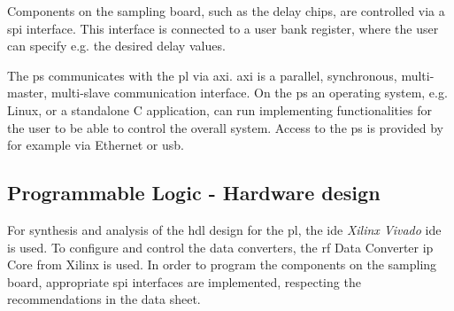 Components on the sampling board, such as the delay chips, are controlled via a \gls{spi} interface. 
This interface is connected to a user bank register, where the user can specify e.g. the desired delay values.

The \gls{ps} communicates with the \gls{pl} via \gls{axi}.
\gls{axi} is a parallel, synchronous, multi-master, multi-slave communication interface.
On the \gls{ps} an operating system, e.g. Linux, or a standalone C application, can run implementing functionalities for the user to be able to control the overall system.
Access to the \gls{ps} is provided by for example via Ethernet or \gls{usb}.


\subsection{Programmable Logic - Hardware design}
For synthesis and analysis of the \gls{hdl} design for the \gls{pl}, the \gls{ide} \textit{Xilinx Vivado} \gls{ide} is used.
To configure and control the data converters, the \gls{rf} Data Converter \gls{ip} Core from Xilinx is used.
In order to program the components on the sampling board, appropriate \gls{spi} interfaces are implemented, respecting the recommendations in the data sheet.

